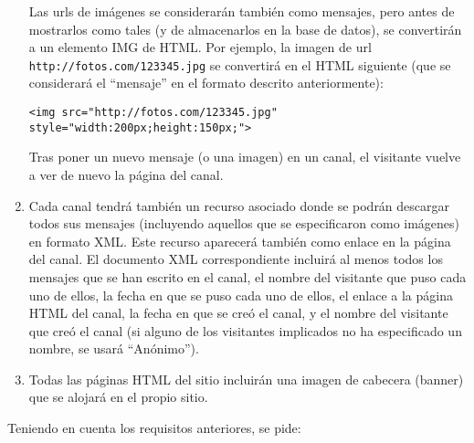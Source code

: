 \begin{enumerate}
Las urls de imágenes se considerarán también como mensajes, pero antes de mostrarlos como tales (y de almacenarlos en la base de datos), se convertirán a un elemento IMG de HTML. Por ejemplo, la imagen de url \verb|http://fotos.com/123345.jpg| se convertirá en el HTML siguiente (que se considerará el ``mensaje'' en el formato descrito anteriormente):

\begin{verbatim}
<img src="http://fotos.com/123345.jpg" style="width:200px;height:150px;">
\end{verbatim}

Tras poner un nuevo mensaje (o una imagen) en un canal, el visitante vuelve a ver de nuevo la página del canal.

\item Cada canal tendrá también un recurso asociado donde se podrán descargar todos sus mensajes (incluyendo aquellos que se especificaron como imágenes) en formato XML. Este recurso aparecerá también como enlace en la página del canal. El documento XML correspondiente incluirá al menos todos los mensajes que se han escrito en el canal, el nombre del visitante que puso cada uno de ellos, la fecha en que se puso cada uno de ellos, el enlace a la página HTML del canal, la fecha en que se creó el canal, y el nombre del visitante que creó el canal (si alguno de los visitantes implicados no ha especificado un nombre, se usará ``Anónimo'').
\item Todas las páginas HTML del sitio incluirán una imagen de cabecera (banner) que se alojará en el propio sitio.
\end{enumerate}

Teniendo en cuenta los requisitos anteriores, se pide:

